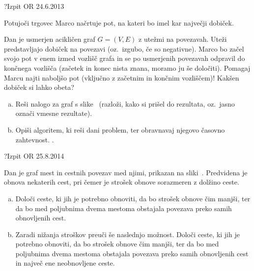\begin{naloga}{?}{Izpit OR 24.6.2013}
\begin{vprasanje}[marco]
Potujoči trgovec Marco načrtuje pot, na kateri bo imel kar največji dobiček.

Dan je usmerjen acikličen graf $G = (V, E)$ z utežmi na povezavah.
Uteži predstavljajo dobiček na povezavi (oz.~izgubo, če so negativne).
Marco bo začel svojo pot v enem izmed vozlišč grafa
in se po usmerjenih povezavah odpravil do končnega vozlišča
(začetek in konec nista znana, moramo ju še določiti).
Pomagaj Marcu najti naboljšo pot (vključno z začetnim in končnim vozliščem)!
Kakšen dobiček si lahko obeta?

\begin{enumerate}[(a)]
\item Reši nalogo za graf s slike~\fig{}
(razloži, kako si prišel do rezultata, oz.~jasno označi vmesne rezultate).

\item Opiši algoritem, ki reši dani problem,
ter obravnavaj njegovo časovno zahtevnost.
.
\end{enumerate}

\begin{slika}
\pgfslika
{}
\end{slika}
\end{vprasanje}
\begin{odgovor}
\end{odgovor}
\end{naloga}


\begin{naloga}{?}{Izpit OR 25.8.2014}
\begin{vprasanje}[obnova]
Dan je graf mest in cestnih povezav med njimi, prikazan na sliki~\fig{}.
Predvidena je obnova nekaterih cest,
pri čemer je strošek obnove sorazmeren z dolžino ceste.

\begin{enumerate}[(a)]
\item Določi ceste, ki jih je potrebno obnoviti,
da bo strošek obnove čim manjši,
ter da bo med poljubnima dvema mestoma
obstajala povezava preko samih obnovljenih cest.

\item Zaradi nižanja stroškov preuči še naslednjo možnost.
Določi ceste, ki jih je potrebno obnoviti, da bo strošek obnove čim manjši,
ter da bo med poljubnima dvema mestoma obstajala povezava
preko samih obnovljenih cest in največ ene neobnovljene ceste.
\end{enumerate}

\begin{slika}
\pgfslika
{}
\end{slika}
\end{vprasanje}
\begin{odgovor}
\end{odgovor}
\end{naloga}

